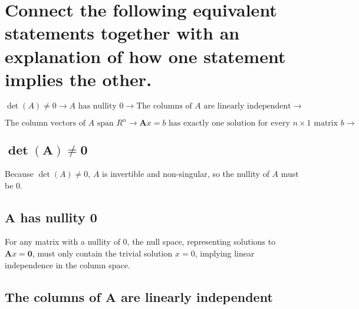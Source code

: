 \documentclass[
  letterpaper,
  DIV=11,
  numbers=noendperiod]{scrartcl}
\begin{document}
\newpage{}

\newpage{}

\hypertarget{connect-the-following-equivalent-statements-together-with-an-explanation-of-how-one-statement-implies-the-other.}{%
\section{Connect the following equivalent statements together with an
explanation of how one statement implies the
other.}\label{connect-the-following-equivalent-statements-together-with-an-explanation-of-how-one-statement-implies-the-other.}}

\(\det{(A)} \neq 0 \rightarrow A \text{ has nullity 0} \rightarrow \text{The columns of } A \text{ are linearly independent} \rightarrow\)

\(\text{The column vectors of } A \text{ span } R^n \rightarrow \symbf{A}x = b \text{ has exactly one solution for every } n \times 1 \text{ matrix } b \rightarrow\)

\hypertarget{symbfdeta-neq-0}{%
\subsection{\texorpdfstring{\(\symbf{\det{(A)} \neq 0}\)}{\textbackslash symbf\{\textbackslash det\{(A)\} \textbackslash neq 0\}}}\label{symbfdeta-neq-0}}

Because \(\det{(A)} \neq 0\), \(A\) is invertible and non-singular, so
the nullity of \(A\) must be 0.

\hypertarget{symbfa-has-nullity-0}{%
\subsection{\texorpdfstring{\(\symbf{A}\) has nullity
0}{\textbackslash symbf\{A\} has nullity 0}}\label{symbfa-has-nullity-0}}

For any matrix with a nullity of 0, the null space, representing
solutions to \(\symbf{A}x = \symbf{0}\), must only contain the trivial
solution \(x = 0\), implying linear independence in the column space.

\hypertarget{the-columns-of-symbfa-are-linearly-independent}{%
\subsection{\texorpdfstring{The columns of \(\symbf{A}\) are linearly
independent}{The columns of \textbackslash symbf\{A\} are linearly independent}}\label{the-columns-of-symbfa-are-linearly-independent}}
\end{document}
